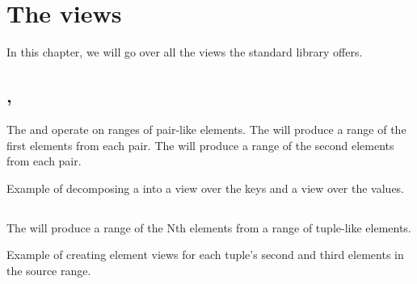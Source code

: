 \chapter{The views}

In this chapter, we will go over all the views the standard library offers.

\section{\texorpdfstring{, }{\texttt{std::views::keys}, \texttt{std::views::values}}}

The  and  operate on ranges of pair-like elements.
The  will produce a range of the first elements from each pair.
The  will produce a range of the second elements from each pair.

\begin{codebox}[]{\href{https://compiler-explorer.com/z/vs1WjT1cM}{\ExternalLink}}
\footnotesize Example of decomposing a  into a view over the keys and a view over the values.
\tcblower
{}
\end{codebox}

\section{\texorpdfstring{}{\texttt{std::views::elements}}}

The  will produce a range of the Nth elements from a range of tuple-like elements.

\begin{codebox}[]{\href{https://compiler-explorer.com/z/efjT5o8G8}{\ExternalLink}}
\footnotesize Example of creating element views for each tuple's second and third elements in the source range.
\tcblower
{}
\end{codebox}

\section{\texorpdfstring{}{\texttt{std::views::transform}}}

